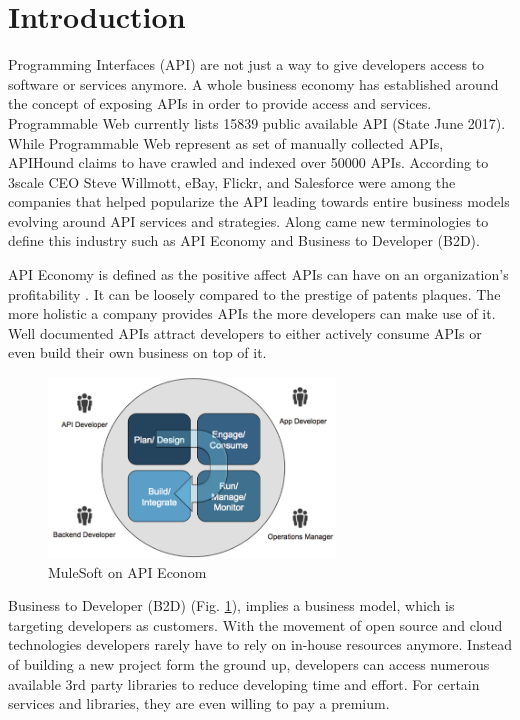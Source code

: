 \documentclass[a4paper]{IEEEtran}
\begin{document}
\section{Introduction}
 Programming Interfaces (API) are not just a way to give developers access to software or services anymore. A whole business economy has established around the concept of exposing APIs in order to provide access and services. Programmable Web currently lists 15839 public available API (State June 2017). While Programmable Web represent as set of manually collected APIs, APIHound claims to have crawled and indexed over 50000 APIs.
According to 3scale CEO Steve Willmott, eBay, Flickr, and Salesforce were among the companies that helped popularize the API \cite{tmcnet} leading towards entire business models evolving around API services and strategies. Along came new terminologies to define this industry such as API Economy and Business to Developer (B2D).

API Economy is defined as the positive affect APIs can have on an organization’s profitability \cite{mulesoft}.
It can be loosely compared to the prestige of patents plaques. The more holistic a company provides APIs the more developers can make use of it. Well documented APIs attract developers to either actively consume APIs or even build their own business on top of it.

\begin{figure}[!t]
\centering
\includegraphics[width= 3in]{img/APIcycle.png}
\caption{MuleSoft on API Econom \cite{mulesoft}}
\label{fig_sim}
\end{figure}

Business to Developer (B2D) (Fig. \ref{fig_sim}), implies a business model, which is targeting developers as customers. With the movement of open source and cloud technologies developers rarely have to rely on in-house resources anymore. Instead of building a new project form the ground up, developers can access numerous available 3rd party libraries to reduce developing time and effort. For certain services and libraries, they are even willing to pay a premium.
\end{document}
